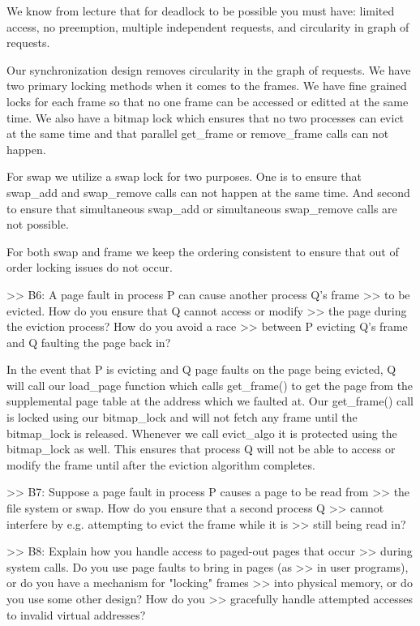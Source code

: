 We know from lecture that for deadlock to be possible you must have: limited 
access, no preemption, multiple independent requests, and circularity in 
graph of requests. 

Our synchronization design removes circularity in the graph of requests.
We have two primary locking methods when it comes to the frames. We have
fine grained locks for each frame so that no one frame can be accessed
or editted at the same time. We also have a bitmap lock which ensures that
no two processes can evict at the same time and that parallel get_frame
or remove_frame calls can not happen. 

For swap we utilize a swap lock for two purposes. One is to ensure that
swap_add and swap_remove calls can not happen at the same time. And second
to ensure that simultaneous swap_add or simultaneous swap_remove calls
are not possible. 

For both swap and frame we keep the ordering consistent
to ensure that out of order locking issues do not occur. 

>> B6: A page fault in process P can cause another process Q's frame
>> to be evicted.  How do you ensure that Q cannot access or modify
>> the page during the eviction process?  How do you avoid a race
>> between P evicting Q's frame and Q faulting the page back in?

In the event that P is evicting and Q page faults on the page being evicted,
Q will call our load_page function which calls get_frame() to get the page
from the supplemental page table at the address which we faulted at. 
Our get_frame() call is locked using our bitmap_lock and will not fetch 
any frame until the bitmap_lock is released. Whenever we call evict_algo 
it is protected using the bitmap_lock as well. This ensures that process 
Q will not be able to access or modify the frame until after the eviction 
algorithm completes. 

>> B7: Suppose a page fault in process P causes a page to be read from
>> the file system or swap.  How do you ensure that a second process Q
>> cannot interfere by e.g. attempting to evict the frame while it is
>> still being read in?

>> B8: Explain how you handle access to paged-out pages that occur
>> during system calls.  Do you use page faults to bring in pages (as
>> in user programs), or do you have a mechanism for "locking" frames
>> into physical memory, or do you use some other design?  How do you
>> gracefully handle attempted accesses to invalid virtual addresses?

